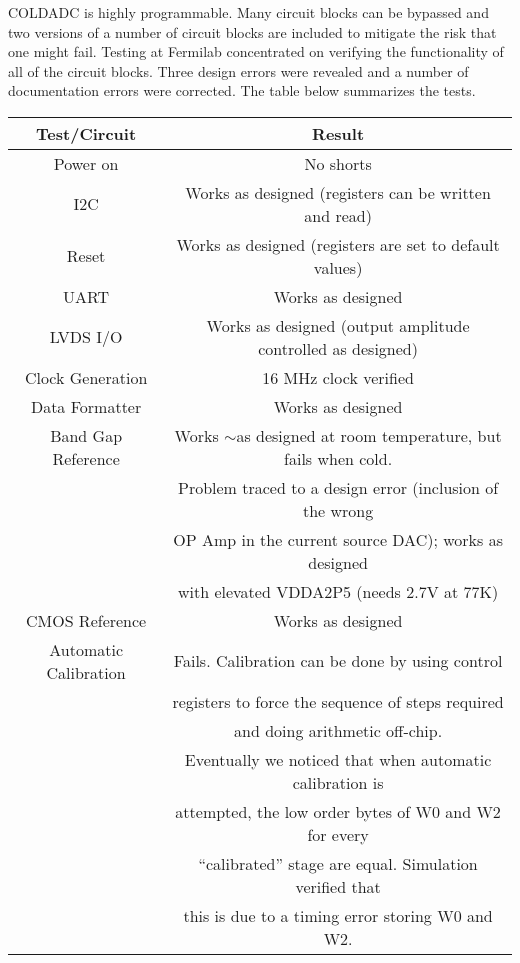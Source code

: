 \label{sec:3}

COLDADC is highly programmable.  Many circuit blocks can be bypassed and two versions of a number of circuit blocks are included to mitigate the risk that one might fail.  Testing at Fermilab concentrated on verifying the functionality of all of the circuit blocks.  Three design errors were revealed and a number of documentation errors were corrected.  The table below summarizes the tests.
 
 \begin{table}[h]
\centering
\begin{tabular}{|c|c|}
\hline
\textbf{ Test/Circuit} & Result  \\ \hline \hline
Power on &  No shorts \\ \hline
I2C & Works as designed (registers can be written and read) \\ \hline
Reset & Works as designed (registers are set to default values) \\ \hline
UART & Works as designed \\ \hline
LVDS I/O & Works as designed (output amplitude controlled as designed) \\ \hline
Clock Generation & 16 MHz clock verified \\ \hline
Data Formatter & Works as designed \\ \hline
Band Gap Reference & Works $\sim$as designed at room temperature, but fails when cold. \\ \hline
 & Problem traced to a design error (inclusion of the wrong \\ \hline
 &  OP Amp in the current source DAC); works as designed \\ \hline
 &  with elevated VDDA2P5 (needs 2.7V at 77K) \\ \hline
 CMOS Reference & Works as designed \\ \hline
 Automatic Calibration & Fails.  Calibration can be done by using control \\ \hline
  & registers to force the sequence of steps required \\ \hline
   & and doing arithmetic off-chip.\\ \hline
    & Eventually we noticed that when automatic calibration is \\ \hline
     & attempted, the low order bytes of W0 and W2 for every \\ \hline
      & ``calibrated'' stage are equal. Simulation verified that  \\ \hline
       & this is due to a timing error storing W0 and W2. \\ \hline

\end{tabular}
\end{table}
